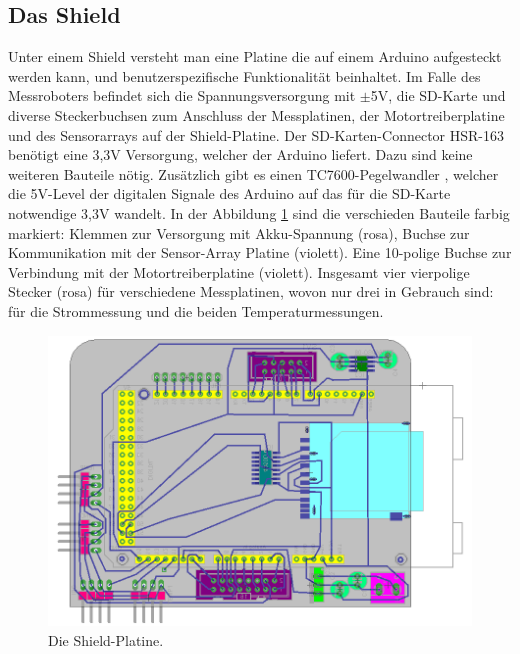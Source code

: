 \documentclass[a4paper,bibtotoc,oneside]{scrbook}
\begin{document}
\subsection{Das Shield}\thispagestyle{empty}
Unter einem Shield versteht man eine Platine die auf einem Arduino aufgesteckt werden kann, und benutzerspezifische Funktionalität beinhaltet. Im Falle des Messroboters befindet sich die Spannungsversorgung mit $\pm$5V, die SD-Karte und diverse Steckerbuchsen zum Anschluss der Messplatinen, der Motortreiberplatine und des Sensorarrays auf der Shield-Platine. 
Der SD-Karten-Connector HSR-163 \cite{hsr} benötigt eine 3,3V Versorgung, welcher der Arduino liefert. Dazu sind keine weiteren Bauteile nötig. 
Zusätzlich gibt es einen TC7600-Pegelwandler \cite{tc7660}, welcher die 5V-Level der digitalen Signale des Arduino auf das für die SD-Karte notwendige 3,3V wandelt.
In der Abbildung  \ref{shield} sind die verschieden Bauteile farbig markiert:
Klemmen zur Versorgung mit Akku-Spannung (rosa), Buchse zur Kommunikation mit der Sensor-Array Platine (violett). Eine 10-polige Buchse zur Verbindung mit der Motortreiberplatine (violett). Insgesamt vier vierpolige Stecker (rosa) für verschiedene Messplatinen, wovon nur drei in Gebrauch sind: für die Strommessung und die beiden Temperaturmessungen.

\begin{figure}[htbp]
\centering
\includegraphics[width=125mm]{img/shield.png}
\caption{Die Shield-Platine.}\label{shield}
\end{figure}
\end{document}
